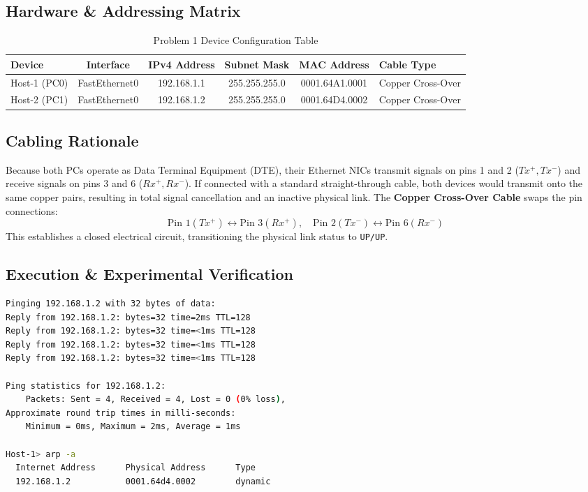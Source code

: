 \documentclass[12pt, a4paper]{article}
\begin{document}
\subsection{Hardware \& Addressing Matrix}
\begin{table}[H]
\centering
\caption{Problem 1 Device Configuration Table}
\label{tab:prob1_devices}
\begin{tabularx}{\textwidth}{lccccX}
\toprule
\textbf{Device} & \textbf{Interface} & \textbf{IPv4 Address} & \textbf{Subnet Mask} & \textbf{MAC Address} & \textbf{Cable Type} \\
\midrule
Host-1 (PC0) & FastEthernet0 & 192.168.1.1 & 255.255.255.0 & 0001.64A1.0001 & Copper Cross-Over \\
Host-2 (PC1) & FastEthernet0 & 192.168.1.2 & 255.255.255.0 & 0001.64D4.0002 & Copper Cross-Over \\
\bottomrule
\end{tabularx}
\end{table}

\subsection{Cabling Rationale}
Because both PCs operate as Data Terminal Equipment (DTE), their Ethernet NICs transmit signals on pins 1 and 2 ($Tx^+, Tx^-$) and receive signals on pins 3 and 6 ($Rx^+, Rx^-$). If connected with a standard straight-through cable, both devices would transmit onto the same copper pairs, resulting in total signal cancellation and an inactive physical link. 
The \textbf{Copper Cross-Over Cable} swaps the pin connections:
\begin{equation}
    \text{Pin } 1 (Tx^+) \longleftrightarrow \text{Pin } 3 (Rx^+), \quad \text{Pin } 2 (Tx^-) \longleftrightarrow \text{Pin } 6 (Rx^-)
\end{equation}
This establishes a closed electrical circuit, transitioning the physical link status to \texttt{UP/UP}.

\subsection{Execution \& Experimental Verification}
\begin{lstlisting}[language=bash, caption={Problem 1 Execution Trace and ARP Table Evolution}]
Pinging 192.168.1.2 with 32 bytes of data:
Reply from 192.168.1.2: bytes=32 time=2ms TTL=128
Reply from 192.168.1.2: bytes=32 time=<1ms TTL=128
Reply from 192.168.1.2: bytes=32 time=<1ms TTL=128
Reply from 192.168.1.2: bytes=32 time=<1ms TTL=128

Ping statistics for 192.168.1.2:
    Packets: Sent = 4, Received = 4, Lost = 0 (0% loss),
Approximate round trip times in milli-seconds:
    Minimum = 0ms, Maximum = 2ms, Average = 1ms

Host-1> arp -a
  Internet Address      Physical Address      Type
  192.168.1.2           0001.64d4.0002        dynamic
\end{lstlisting}
\end{document}
